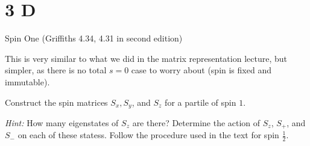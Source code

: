 \documentclass{article}
\begin{document}
\newpage

\section*{3 D}
\begin{ques}\label{q3}
Spin One (Griffiths 4.34, 4.31 in second edition)

This is very similar to what we did in the matrix representation lecture, but simpler, as there is no total $s = 0$ case to worry about (spin is fixed and immutable).

Construct the spin matrices $S_x,S_y$, and $S_z$ for a partile of spin $1$.

\emph{Hint:} How many eigenstates of $S_z$ are there? Determine the action of $S_z$, $S_+$, and $S_-$ on each of these statess. Follow the procedure used in the text for spin $\frac{1}{2}$.
\end{ques}
\end{document}
